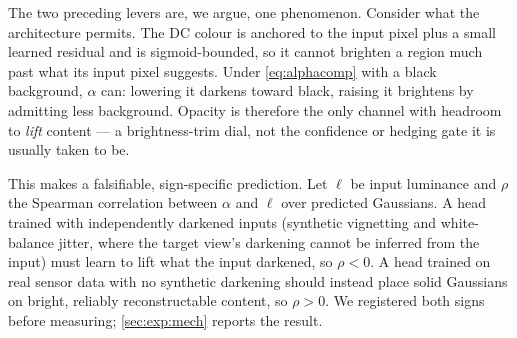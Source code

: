The two preceding levers are, we argue, one phenomenon. Consider what the
architecture permits. The DC colour is anchored to the input pixel plus a
small learned residual and is sigmoid-bounded, so it cannot brighten a region
much past what its input pixel suggests. Under \cref{eq:alphacomp} with a black
background, $\alpha$ can: lowering it darkens toward black, raising it
brightens by admitting less background. Opacity is therefore the only channel
with headroom to \emph{lift} content --- a brightness-trim dial, not the
confidence or hedging gate it is usually taken to be.

This makes a falsifiable, sign-specific prediction. Let $\ell$ be input
luminance and $\rho$ the Spearman correlation between $\alpha$ and $\ell$ over
predicted Gaussians. A head trained with independently darkened inputs
(synthetic vignetting and white-balance jitter, where the target view's
darkening cannot be inferred from the input) must learn to lift what the input
darkened, so $\rho<0$. A head trained on real sensor data with no synthetic
darkening should instead place solid Gaussians on bright, reliably
reconstructable content, so $\rho>0$. We registered both signs before
measuring; \cref{sec:exp:mech} reports the result.
